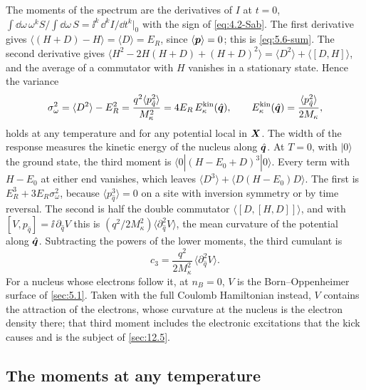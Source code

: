 The moments of the spectrum are the derivatives of $I$ at $t = 0$, $\int\dd\omega\,\omega^kS/\int\dd\omega\,S = \ii^k\,\dd^kI/\dd t^k|_0$ with the sign of \cref{eq:4.2-Sab}. The first derivative gives $\langle(H + D) - H\rangle = \langle D\rangle = E_R$, since $\langle\bm{p}\rangle = 0$; this is \cref{eq:5.6-sum}. The second derivative gives $\langle H^2 - 2H(H + D) + (H + D)^2\rangle = \langle D^2\rangle + \langle[D, H]\rangle$, and the average of a commutator with $H$ vanishes in a stationary state. Hence the variance
\begin{equation}
  \sigma_\omega^2 = \langle D^2\rangle - E_R^2 = \frac{q^2\langle p_{\hat q}^2\rangle}{M_\kappa^2} = 4E_R\,E^{\mathrm{kin}}_\kappa(\hat{\bm{q}}) , \qquad E^{\mathrm{kin}}_\kappa(\hat{\bm{q}}) = \frac{\langle p_{\hat q}^2\rangle}{2M_\kappa} ,
  \label{eq:D.32-var}
\end{equation}
holds at any temperature and for any potential local in $\bm{X}$. The width of the response measures the kinetic energy of the nucleus along $\hat{\bm{q}}$. At $T = 0$, with $|0\rangle$ the ground state, the third moment is $\langle0|(H - E_0 + D)^3|0\rangle$. Every term with $H - E_0$ at either end vanishes, which leaves $\langle D^3\rangle + \langle D(H - E_0)D\rangle$. The first is $E_R^3 + 3E_R\sigma_\omega^2$, because $\langle p_{\hat q}^3\rangle = 0$ on a site with inversion symmetry or by time reversal. The second is half the double commutator $\langle[D,[H, D]]\rangle$, and with $[V, p_{\hat q}] = \ii\,\partial_{\hat q}V$ this is $(q^2/2M_\kappa^2)\langle\partial_{\hat q}^2V\rangle$, the mean curvature of the potential along $\hat{\bm{q}}$. Subtracting the powers of the lower moments, the third cumulant is
\begin{equation}
  c_3 = \frac{q^2}{2M_\kappa^2}\,\bigl\langle\partial_{\hat q}^2V\bigr\rangle .
  \label{eq:D.32-c3}
\end{equation}
For a nucleus whose electrons follow it, at $n_B = 0$, $V$ is the Born--Oppenheimer surface of \cref{sec:5.1}. Taken with the full Coulomb Hamiltonian instead, $V$ contains the attraction of the electrons, whose curvature at the nucleus is the electron density there; that third moment includes the electronic excitations that the kick causes and is the subject of \cref{sec:12.5}.

\subsection{The moments at any temperature}

